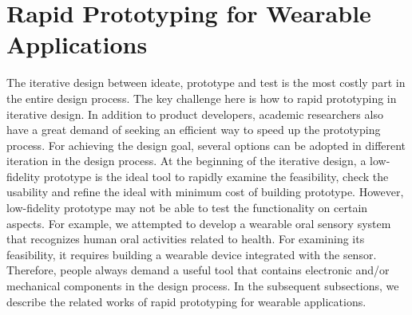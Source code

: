 
\section{Rapid Prototyping for Wearable Applications}
The iterative design\cite{Nielsen:1993:IUD:618985.619982, tripp1990rapid, van2007design} between ideate, prototype and test is the most costly part in the entire design process.
The key challenge here is how to rapid prototyping in iterative design. In addition to product developers, academic researchers also have a great demand of seeking an efficient way to speed up the prototyping process. For achieving the design goal, several options can be adopted in different iteration in the design process. At the beginning of the iterative design, a low-fidelity prototype\cite{walker2002high} is the ideal tool to rapidly examine the feasibility, check the usability and refine the ideal with minimum cost of building prototype. However, low-fidelity prototype may not be able to test the functionality on certain aspects. For example, we attempted to develop a wearable oral sensory system that recognizes human oral activities related to health\cite{Li2013teeth}. For examining its feasibility, it requires building a wearable device integrated with the sensor. Therefore, people always demand a useful tool that contains electronic and/or mechanical components in the design process. In the subsequent subsections, we describe the related works of rapid prototyping for wearable applications.


